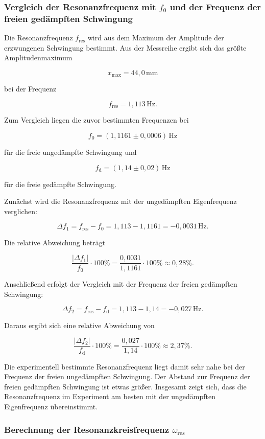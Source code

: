 \documentclass{report}
\begin{document}
\subsubsection*{Vergleich der Resonanzfrequenz mit $f_0$ und der Frequenz der freien gedämpften Schwingung}

Die Resonanzfrequenz $f_\mathrm{res}$ wird aus dem Maximum der Amplitude der erzwungenen Schwingung bestimmt. Aus der Messreihe ergibt sich das größte Amplitudenmaximum

\[
x_\mathrm{max}=44{,}0\,\mathrm{mm}
\]

bei der Frequenz

\[
\boxed{f_\mathrm{res}=1{,}113\,\mathrm{Hz}}.
\]

Zum Vergleich liegen die zuvor bestimmten Frequenzen bei

\[
f_0=(1{,}1161\pm0{,}0006)\,\mathrm{Hz}
\]

für die freie ungedämpfte Schwingung und

\[
f_\mathrm{d}=(1{,}14\pm0{,}02)\,\mathrm{Hz}
\]

für die freie gedämpfte Schwingung.

Zunächst wird die Resonanzfrequenz mit der ungedämpften Eigenfrequenz verglichen:

\[
\Delta f_1 = f_\mathrm{res}-f_0
=1{,}113-1{,}1161
=-0{,}0031\,\mathrm{Hz}.
\]

Die relative Abweichung beträgt

\[
\frac{|\Delta f_1|}{f_0}\cdot 100\%
=
\frac{0{,}0031}{1{,}1161}\cdot 100\%
\approx 0{,}28\%.
\]

Anschließend erfolgt der Vergleich mit der Frequenz der freien gedämpften Schwingung:

\[
\Delta f_2 = f_\mathrm{res}-f_\mathrm{d}
=1{,}113-1{,}14
=-0{,}027\,\mathrm{Hz}.
\]

Daraus ergibt sich eine relative Abweichung von

\[
\frac{|\Delta f_2|}{f_\mathrm{d}}\cdot 100\%
=
\frac{0{,}027}{1{,}14}\cdot 100\%
\approx 2{,}37\%.
\]

Die experimentell bestimmte Resonanzfrequenz liegt damit sehr nahe bei der 
Frequenz der freien ungedämpften Schwingung. Der Abstand zur Frequenz der freien 
gedämpften Schwingung ist etwas größer. Insgesamt zeigt sich, dass die Resonanzfrequenz 
im Experiment am besten mit der ungedämpften Eigenfrequenz übereinstimmt.

\subsubsection*{Berechnung der Resonanzkreisfrequenz $\omega_\mathrm{res}$}
\end{document}
